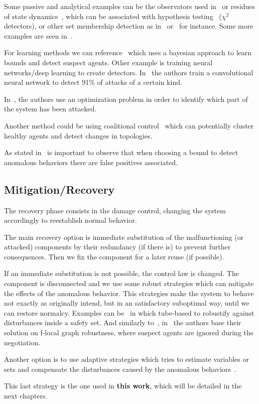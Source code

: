 \documentclass[../main.tex]{subfiles}
\begin{document}
Some passive and analytical examples can be the observators used in~\cite{HoehnZhang2016} or residues of state dynamics~\cite{TeixeiraEtAl2015,BoemEtAl2020}, which can be associated with hypothesis testing~\cite{MoSinopoli2009} ($\chi^{2}$ detectors), or other
set membership detection as in~\cite{FortiEtAl2016} or~\cite{MaestreEtAl2018} for instance.
Some more examples are seen in~\cite{PasqualettiEtAl2012,PasqualettiEtAl2013,ZhangEtAl2021a,ArauzEtAl2021}.

For learning methods we can reference~\cite{AnandutaEtAl2018,AnandutaEtAl2019,AnandutaEtAl2020} which uses
a bayesian approach to learn bounds and detect suspect agents.
Other example is training neural networks/deep learning to create detectors. In~\cite{HussainEtAl2021} the authors train a convolutional neural network to detect 91\% of \dDoS{} attacks of a certain kind.

In~\cite{BraunEtAl2020,BraunEtAl2020a}, the authors use an optimization problem in order to identify which part of the system has been attacked.

Another method could be using coalitional control~\cite{ChanfreutEtAl2021} which can potentially cluster healthy agents and detect changes in topologies.

\begin{remark}\label{rem:bounds_and_error}
As stated in~\cite{ArauzEtAl2021} is important to observe that when choosing a bound to detect anomalous behaviors there are false positives associated.
\end{remark}

\subsection{Mitigation/Recovery}
The recovery phase consists in the damage control, changing the system accordingly to reestablish normal behavior.

The main recovery option is immediate substitution of the malfunctioning (or attacked) components by their redundancy (if there is) to prevent further consequences.
Then we fix the component for a later reuse (if possible).

If an immediate substitution is not possible, the control law is changed.
The component is disconnected and we use some robust strategies which can mitigate the effects of the anomalous behavior.
This strategies make the system to behave not exactly as originally intend, but in an satisfactory suboptimal way, until we can restore normalcy.
Examples can be~\cite{MaestreEtAl2018} in which tube-based \mpc{} to robustify against disturbances inside a safety set.
And similarly to~\cite{VelardeEtAl2018}, in~\cite{AnandutaEtAl2018,AnandutaEtAl2019,AnandutaEtAl2020} the authors base their solution on f-local graph robustness, where suspect agents are ignored during the \dmpc{} negotiation.

Another option is to use adaptive strategies which tries to estimate variables or sets and compensate the disturbances caused by the anomalous behaviors~\cite{YangEtAl2022,LuEtAl2020}.

This last strategy is the one used in \textbf{this work}, which will be detailed in the next chapters.
\end{document}
